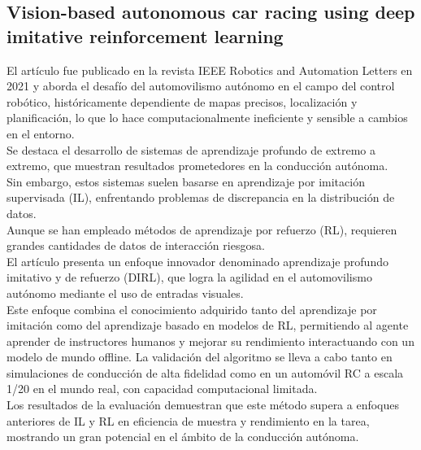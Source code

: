 \subsection{
    \textbf{Vision-based autonomous car racing using deep imitative reinforcement learning}
    ~\cite{cai2021vision}
}\label{subsec:vision-based-autonomous-car-racing}
El artículo fue publicado en la revista IEEE Robotics and Automation Letters en 2021 y aborda el desafío del automovilismo autónomo
en el campo del control robótico, históricamente dependiente de mapas precisos, localización y planificación, lo que lo hace
computacionalmente ineficiente y sensible a cambios en el entorno.
\\
Se destaca el desarrollo de sistemas de aprendizaje profundo de extremo a extremo, que muestran resultados prometedores en la conducción
autónoma.
\\
Sin embargo, estos sistemas suelen basarse en aprendizaje por imitación supervisada (IL), enfrentando problemas de discrepancia
en la distribución de datos.
\\
Aunque se han empleado métodos de aprendizaje por refuerzo (RL), requieren grandes cantidades de datos de interacción riesgosa.
\\
El artículo presenta un enfoque innovador denominado aprendizaje profundo imitativo y de refuerzo (DIRL), que logra la agilidad en
el automovilismo autónomo mediante el uso de entradas visuales.
\\
Este enfoque combina el conocimiento adquirido tanto del aprendizaje por imitación como del aprendizaje basado en modelos de RL,
permitiendo al agente aprender de instructores humanos y mejorar su rendimiento interactuando con un modelo de mundo offline.
La validación del algoritmo se lleva a cabo tanto en simulaciones de conducción de alta fidelidad como en un automóvil RC a escala 1/20 en
el mundo real, con capacidad computacional limitada. \\
Los resultados de la evaluación demuestran que este método supera a enfoques anteriores de IL y RL en eficiencia de muestra y rendimiento
en la tarea, mostrando un gran potencial en el ámbito de la conducción autónoma.
